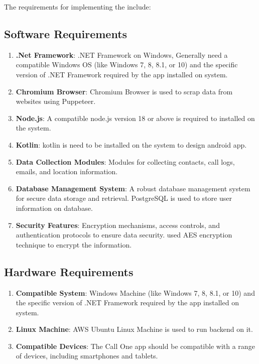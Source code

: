 The requirements for implementing the {\myprojectname} include:

\subsection{Software Requirements}\label{subsec:software-requirements}

\begin{enumerate}[label=\roman*.]
    \item \textbf{.Net Framework}:  .NET Framework on Windows, Generally need a compatible Windows OS (like Windows 7, 8, 8.1, or 10) and the specific version of .NET Framework required by the app installed on system.
    \item \textbf{Chromium Browser}:  Chromium Browser is used to scrap data from websites using Puppeteer.
    \item \textbf{Node.js}: A compatible node.js version 18 or above is required to installed on the system.
    \item \textbf{Kotlin}: kotlin is need to be installed on the system to design android app.
    \item \textbf{Data Collection Modules}: Modules for collecting contacts, call logs, emails, and location information.
    \item \textbf{Database Management System}: A robust database management system for secure data storage and retrieval.
    PostgreSQL is used to store user information on database.
    \item \textbf{Security Features}: Encryption mechanisms, access controls, and authentication protocols to ensure data security.
    used AES encryption technique to encrypt the information.
\end{enumerate}

\subsection{Hardware Requirements}\label{subsec:hardware-requirements}

\begin{enumerate}[label=\roman*.]
    \item \textbf{Compatible System}: Windows Machine (like Windows 7, 8, 8.1, or 10) and the specific version of .NET Framework required by the app installed on system. 
    \item \textbf{Linux Machine}: AWS Ubuntu Linux Machine is used to run backend on it.
    \item \textbf{Compatible Devices}: The Call One app should be compatible with a range of devices, including smartphones and tablets.
\end{enumerate}